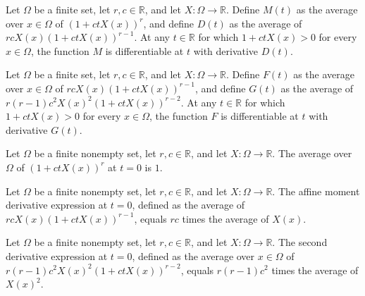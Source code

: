 \begin{theorem}
\label{FABL.affineMoment_hasDerivAt}
\leanok
{}
Let $\Omega$ be a finite set, let $r,c\in\mathbb R$, and let $X:\Omega\to\mathbb R$.
Define $M(t)$ as the average over $x\in\Omega$ of $(1+ctX(x))^r$, and define $D(t)$ as
the average of $rcX(x)(1+ctX(x))^{r-1}$. At any $t\in\mathbb R$ for which $1+ctX(x)>0$
for every $x\in\Omega$, the function $M$ is differentiable at $t$ with derivative
$D(t)$.
\end{theorem}

\begin{theorem}
\label{FABL.affineMomentDeriv_hasDerivAt}
\leanok
{}
Let $\Omega$ be a finite set, let $r,c\in\mathbb R$, and let $X:\Omega\to\mathbb R$.
Define $F(t)$ as the average over $x\in\Omega$ of $rcX(x)(1+ctX(x))^{r-1}$, and define
$G(t)$ as the average of $r(r-1)c^2X(x)^2(1+ctX(x))^{r-2}$. At any $t\in\mathbb R$ for
which $1+ctX(x)>0$ for every $x\in\Omega$, the function $F$ is differentiable at $t$
with derivative $G(t)$.
\end{theorem}

\begin{theorem}
\label{FABL.affineMoment_zero}
\leanok
{}
Let $\Omega$ be a finite nonempty set, let $r,c\in\mathbb R$, and let
$X:\Omega\to\mathbb R$. The average over $\Omega$ of $(1+ctX(x))^r$ at $t=0$ is $1$.
\end{theorem}

\begin{theorem}
\label{FABL.affineMomentDeriv_zero}
\leanok
{}
Let $\Omega$ be a finite nonempty set, let $r,c\in\mathbb R$, and let
$X:\Omega\to\mathbb R$. The affine moment derivative expression at $t=0$, defined as the
average of $rcX(x)(1+ctX(x))^{r-1}$, equals $rc$ times the average of $X(x)$.
\end{theorem}

\begin{theorem}
\label{FABL.affineMomentDeriv2_zero}
\leanok
{}
Let $\Omega$ be a finite nonempty set, let $r,c\in\mathbb R$, and let
$X:\Omega\to\mathbb R$. The second derivative expression at $t=0$, defined as the
average over $x\in\Omega$ of $r(r-1)c^2X(x)^2(1+ctX(x))^{r-2}$, equals $r(r-1)c^2$ times
the average of $X(x)^2$.
\end{theorem}

